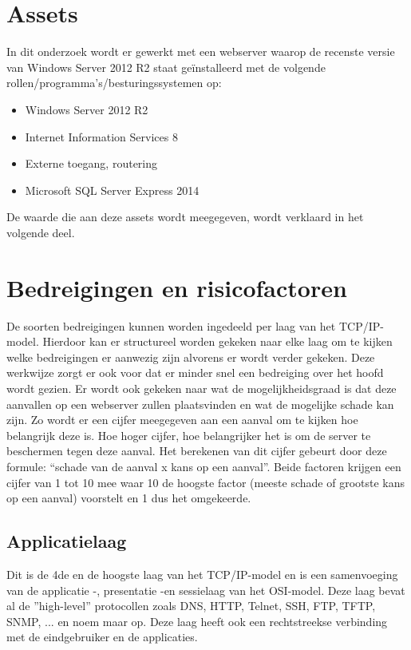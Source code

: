 \documentclass[pdftex,a4paper,12pt]{report}
\begin{document}
\section{Assets}
In dit onderzoek wordt er gewerkt met een webserver waarop de recenste versie van Windows Server 2012 R2 staat geïnstalleerd met de volgende rollen/programma's/besturingssystemen op:
\begin{itemize}
	\item Windows Server 2012 R2 
	\item Internet Information Services 8 
	\item Externe toegang, routering 
	\item Microsoft SQL Server Express 2014 
\end{itemize}
De waarde die aan deze assets wordt meegegeven, wordt verklaard in het volgende deel.

\section{Bedreigingen en risicofactoren}
De soorten bedreigingen kunnen worden ingedeeld per laag van het TCP/IP-model. Hierdoor kan er structureel worden gekeken naar elke laag om te kijken welke bedreigingen er aanwezig zijn alvorens er wordt verder gekeken. Deze werkwijze zorgt er ook voor dat er minder snel een bedreiging over het hoofd wordt gezien. Er wordt ook gekeken naar wat de mogelijkheidsgraad is dat deze aanvallen op een webserver zullen plaatsvinden en wat de mogelijke schade kan zijn. Zo wordt er een cijfer meegegeven aan een aanval om te kijken hoe belangrijk deze is. Hoe hoger cijfer, hoe belangrijker het is om de server te beschermen tegen deze aanval. Het berekenen van dit cijfer gebeurt door deze formule: "`schade van de aanval x kans op een aanval"'. Beide factoren krijgen een cijfer van 1 tot 10 mee waar 10 de hoogste factor (meeste schade of grootste kans op een aanval) voorstelt en 1 dus het omgekeerde. \citep{Sim2005}

\subsection{Applicatielaag}
Dit is de 4de en de hoogste laag van het TCP/IP-model en is een samenvoeging van de applicatie -, presentatie -en sessielaag van het OSI-model. Deze laag bevat al de ''high-level'' protocollen zoals DNS, HTTP, Telnet, SSH, FTP, TFTP, SNMP, ... en noem maar op. Deze laag heeft ook een rechtstreekse verbinding met de eindgebruiker en de applicaties. \citep{Thomas2013}
\end{document}
